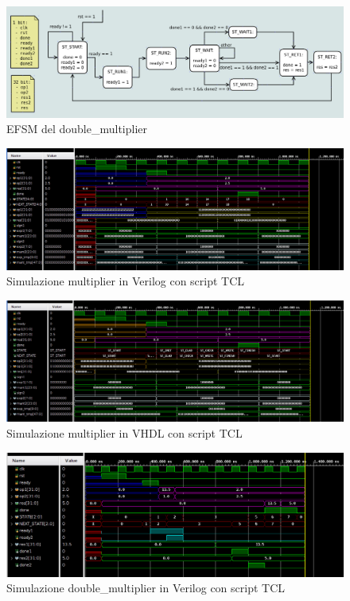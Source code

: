 \documentclass[]{IEEEtran}
\begin{document}
\begin{figure}[bt]
    \centering
    \includegraphics[width=\textwidth]{figures/EFSM_dm}
    \caption{EFSM del double\_multiplier}
    \label{fig:EFSM_DM}
\end{figure}

\begin{figure}[bt]
    \centering
    \includegraphics[width=\textwidth]{figures/sim_mult_verilog}
    \caption{Simulazione multiplier in Verilog con script TCL}
    \label{fig:SIM_MULT_VERILOG}
\end{figure}

\begin{figure}[bt]
    \centering
    \includegraphics[width=\textwidth]{figures/sim_mult_vhdl}
    \caption{Simulazione multiplier in VHDL con script TCL}
    \label{fig:SIM_MULT_VHDL}
\end{figure}

\begin{figure}[bt]
    \centering
    \includegraphics[width=\textwidth]{figures/sim_dm}
    \caption{Simulazione double\_multiplier in Verilog con script TCL}
    \label{fig:SIM_DM}
\end{figure}
\end{document}
